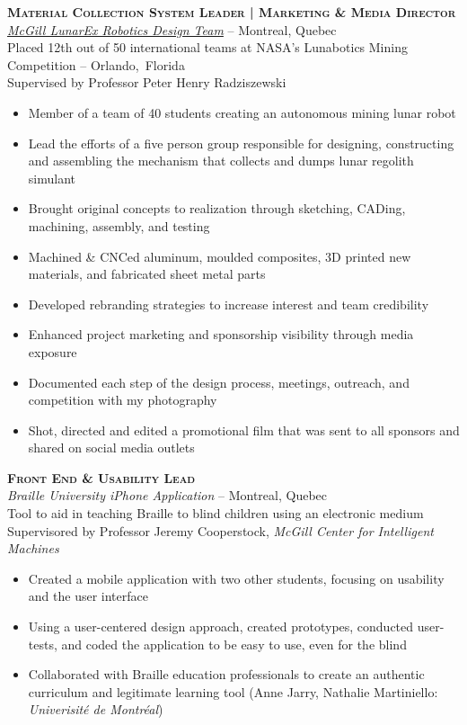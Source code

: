 \documentclass[12pt, letterpaper]{article}
\newcommand{\years}[1]{\marginnote{\footnotesize #1}} %
\begin{document}
\clearpage

\begin{samepage}
\years{8/2012 - 8/2013} \textbf{\scshape Material Collection System Leader | Marketing \& Media Director}\\
\href{http://www.lunarex.mcgill.ca}{\textit{McGill LunarEx Robotics Design Team}} -- Montreal, Quebec\\
{\small Placed 12th out of 50 international teams at NASA's Lunabotics Mining Competition -- Orlando,~Florida\\
Supervised by Professor Peter Henry Radziszewski}
\begin{itemize}
\item Member of a team of 40 students creating an autonomous mining lunar robot 
\item Lead the efforts of a five person group responsible for designing, constructing and assembling the mechanism that collects and dumps lunar regolith simulant
\item Brought original concepts to realization through sketching, CADing, machining, assembly, and testing
\item Machined \& CNCed aluminum, moulded composites, 3D printed new materials, and fabricated sheet metal parts
\item Developed rebranding strategies to increase interest and team credibility
\item Enhanced project marketing and sponsorship visibility through media exposure
\item Documented each step of the design process,  meetings, outreach, and competition with my photography
\item Shot, directed and edited a promotional film that was sent to all sponsors and shared on social media outlets
\end{itemize}
\end {samepage}

\begin{samepage}
\years{1/2013 - 8/2013} \textbf{\scshape Front End \& Usability Lead}\\
\textit{Braille University iPhone Application} -- Montreal, Quebec\\
Tool to aid in teaching Braille to blind children using an electronic medium\\
{\small Supervisored by Professor Jeremy Cooperstock, \textsl {McGill Center for Intelligent Machines}}
\begin{itemize}
\item Created a mobile application with two other students, focusing on usability and the user interface
\item Using a user-centered design approach, created prototypes, conducted user-tests, and coded the application to be easy to use, even for the blind
\item Collaborated with Braille education professionals to create an authentic curriculum and legitimate learning tool (Anne Jarry, Nathalie Martiniello: \textit {Univerisit\'e de Montr\'eal})
\end{itemize}
\end {samepage}
\end{document}
